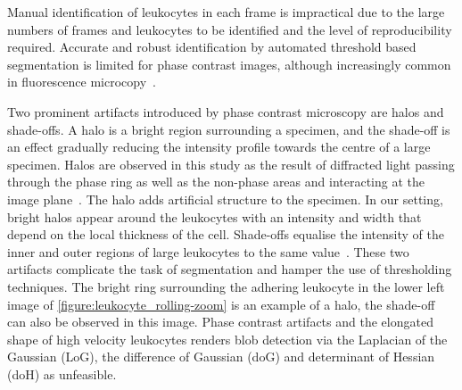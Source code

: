 Manual identification of leukocytes in each frame is impractical due to the large numbers of frames and leukocytes to be identified and the level of reproducibility required. Accurate and robust identification by automated threshold based segmentation is limited for phase contrast images, although increasingly common in fluorescence microcopy~\cite{Hand2009}.

Two prominent artifacts introduced by phase contrast microscopy are halos and shade-offs. A halo is a bright region surrounding a specimen, and the shade-off is an effect gradually reducing the intensity profile towards the centre of a large specimen. Halos are observed in this study as the result of diffracted light passing through the phase ring as well as the non-phase areas and interacting at the image plane~\cite{Yin2012}. The halo adds artificial structure to the specimen. In our setting, bright halos appear around the leukocytes with an intensity and width that depend on the local thickness of the cell. Shade-offs equalise the intensity of the inner and outer regions of large leukocytes to the same value~\cite{Otaki2000}. These two artifacts complicate the task of segmentation and hamper the use of thresholding techniques. The bright ring surrounding the adhering leukocyte in the lower left image of \autoref{figure:leukocyte_rolling-zoom} is an example of a halo, the shade-off can also be observed in this image. Phase contrast artifacts and the elongated shape of high velocity leukocytes renders blob detection via the Laplacian of the Gaussian (LoG), the difference of Gaussian (doG) and determinant of Hessian (doH) as unfeasible.

